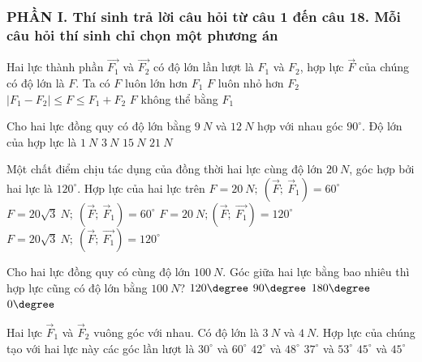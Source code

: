 \subsubsection*{PHẦN I. Thí sinh trả lời câu hỏi từ câu 1 đến câu 18. Mỗi câu hỏi thí sinh chỉ chọn một phương án}
\setcounter{ex}{0}
\begin{ex}
Hai lực thành phần $\vec{F_1}$ và $\vec{F_2}$ có độ lớn lần lượt là $F_1$ và $F_2$, hợp lực $\vec{F}$ của chúng có độ lớn là $F$. Ta có
\choice
{$F$ luôn lớn hơn $F_1$}
{$F$ luôn nhỏ hơn $F_2$}
{\True $\left|F_1-F_2\right| \leq F \leq F_1+F_2$}
{$F$ không thể bằng $F_1$}
\loigiai{}
\end{ex}
\begin{ex}%
Cho hai lực đồng quy có độ lớn bằng $9\ N$ và $12\ N$ hợp với nhau góc $90^\circ$. Độ lớn của hợp lực là
\choice
{$1\ N$}
{$3\ N$}
{\True $15\ N$}
{$21\ N$}
 \end{ex}
\begin{ex}%
Một chất điểm chịu tác dụng của đồng thời hai lực cùng độ lớn $20\ N$, góc hợp bởi hai lực là $120^{\circ}$. Hợp lực của hai lực trên
\choice
{\True $F=20\ N ;\ \left(\vec{F} ;\ \vec{F}_{1}\right)=60^{\circ}$}
{$F=20 \sqrt{3}\ N ;\ \left(\vec{F} ;\ \vec{F}_{1}\right)=60^{\circ}$}
{$F=20\ N ;\left(\vec{F} ;\ \vec{F_{1}}\right)=120^{\circ}$}
{$F=20 \sqrt{3}\ N ;\ \left(\vec{F} ;\ \vec{F_{1}}\right)=120^{\circ}$}
 \end{ex}
\begin{ex}%
Cho hai lực đồng quy có cùng độ lớn $100\ N$. Góc giữa hai lực bằng bao nhiêu thì hợp lực cũng có độ lớn bằng $100\ N$?
\choice
{\True $120\degree$}
{$90\degree$}
{$180\degree$}
{$0\degree$}
 \end{ex}
\begin{ex}%
Hai lực $\vec{F}_{1}$ và $\vec{F}_{2}$ vuông góc với nhau. Có độ lớn là $3\ N$ và $4\ N$. Hợp lực của chúng tạo với hai lực này các góc lần lượt là 
\choice
{$30^{\circ}$ và $60^{\circ}$}
{$42^{\circ}$ và $48^{\circ}$}
{\True $37^{\circ}$ và $53^{\circ}$}
{$45^{\circ}$ và $45^{\circ}$}

 \end{ex}
